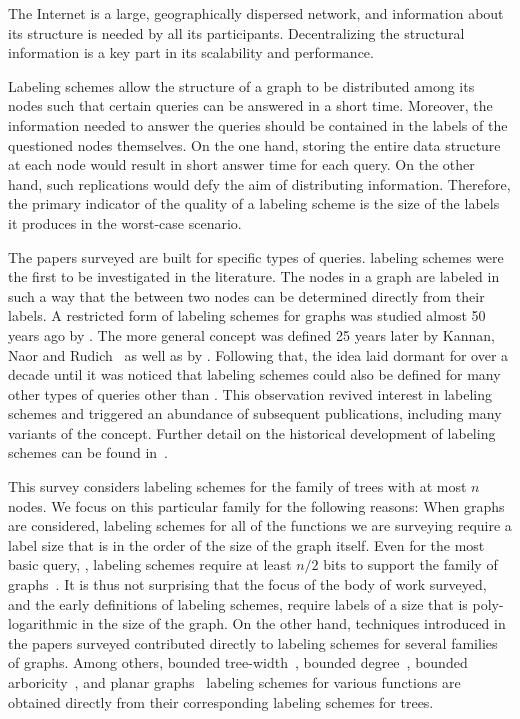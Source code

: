 The Internet is a  large, geographically dispersed network, and information about its structure is needed by all its participants.
Decentralizing the structural information is a key part in its scalability and performance.

Labeling schemes allow the structure of a  graph to be distributed among its nodes  such that certain queries can be answered in a short time.
Moreover, the information needed to answer the queries should be contained in the labels of the questioned nodes themselves.
On the one hand, storing the entire data structure at each node would result in short answer time for each query.
On the other hand, such replications would defy the aim of distributing information.
Therefore, the primary indicator of the quality of a labeling scheme is the size of the labels it produces in the worst-case scenario.

 The papers surveyed are built for specific types of queries. \adjacency {} labeling schemes were the first to be investigated in the literature. The nodes in a graph  are labeled in such a way that the \adjacency between two nodes can be determined directly from their labels. A restricted form of \adjacency labeling schemes for graphs was studied almost 50 years ago by . The more general concept  was defined 25 years later by Kannan, Naor and Rudich~ as well as by . Following that, the idea laid dormant for over a decade until it was noticed that labeling schemes could also be defined for many other types of queries other than \adjacency. This observation revived interest in labeling schemes and triggered an abundance of subsequent publications, including many variants of the concept. Further detail on the historical development of labeling schemes can be found in~\cite{Peleg03}.

This survey considers labeling schemes for the family of trees with at most $n$ nodes. We focus on this particular family for the following reasons: 
When graphs are considered, labeling schemes for all of  the  functions we are surveying require a  label size that is in the  order of the size of the graph itself. Even for the most basic query, \adjacency, labeling schemes require at least $n/2$ bits to support the family of  graphs~\cite{rado1964universal}.
It is thus not surprising that the focus of the body of work surveyed, and  the early definitions of labeling schemes,  require labels of a size that is poly-logarithmic in the size of the graph. 
On the other hand, techniques introduced in  the papers surveyed  contributed directly to  labeling schemes for several families of  graphs.
Among others, bounded tree-width~\cite{gavoille2007shorter}, bounded degree~\cite{adjiashvili2014labeling}, bounded arboricity~\cite{Alstrup02}, and planar graphs~\cite{Thorup01} labeling schemes  for various functions are obtained directly from their corresponding labeling schemes for trees. 

